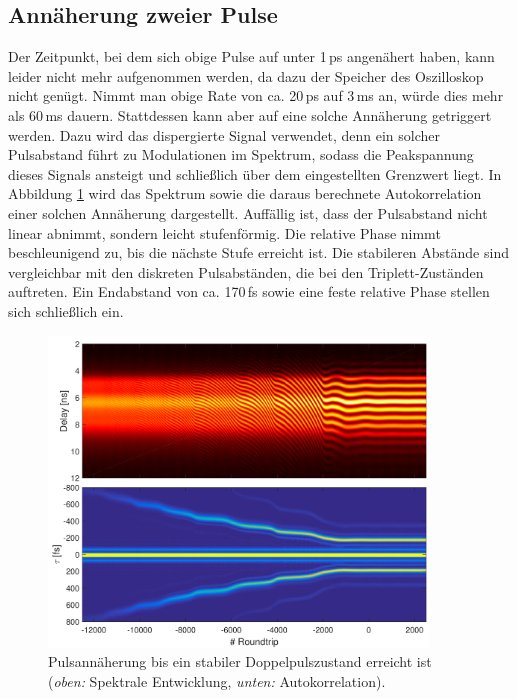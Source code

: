 \documentclass[bachelor,       %
               twoside,        %
               BCOR10mm,       %
               liststotoc,nomtotoc,bibtotoc, %
               english,ngerman, %
               final,          %
               ]{GAUBM}
\begin{document}
\clearpage
\subsection{Annäherung zweier Pulse}
Der Zeitpunkt, bei dem sich obige Pulse auf unter 1\,ps angenähert haben, kann leider nicht mehr aufgenommen werden, da dazu der Speicher des Oszilloskop nicht genügt.
Nimmt man obige Rate von ca. 20\,ps auf 3\,ms an, würde dies mehr als 60\,ms dauern.
Stattdessen kann aber auf eine solche Annäherung getriggert werden.
Dazu wird das dispergierte Signal verwendet, denn ein solcher Pulsabstand führt zu Modulationen im Spektrum, sodass die Peakspannung dieses Signals ansteigt und schließlich über dem eingestellten Grenzwert liegt.
In Abbildung \ref{fig:StartAnnaeherung} wird das Spektrum sowie die daraus berechnete Autokorrelation einer solchen Annäherung dargestellt.
Auffällig ist, dass der Pulsabstand nicht linear abnimmt, sondern leicht stufenförmig.
Die relative Phase nimmt beschleunigend zu, bis die nächste Stufe erreicht ist.
Die stabileren Abstände sind vergleichbar mit den diskreten Pulsabständen, die bei den Triplett-Zuständen auftreten.
Ein Endabstand von ca. 170\,fs sowie eine feste relative Phase stellen sich schließlich ein.
\begin{figure}[!htb]
	\centering
	\includegraphics[width=0.9\textwidth]{figures/4ms_25GSA_400m_MLstart_Doppelpulse2_Annaeherung_280500}
	\caption{Pulsannäherung bis ein stabiler Doppelpulszustand erreicht ist\\
	(\textit{oben:} Spektrale Entwicklung, \textit{unten:} Autokorrelation).}
	\label{fig:StartAnnaeherung}
\end{figure}
\end{document}

